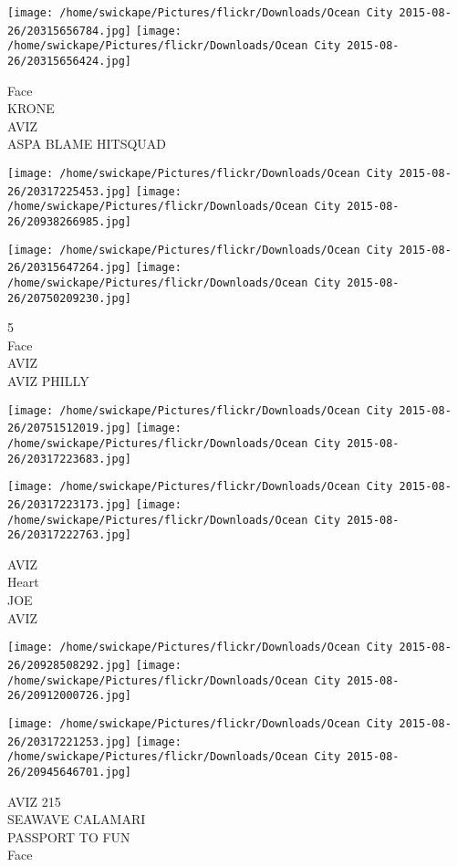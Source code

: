 \documentclass[10pt,letterpaper]{article}
\begin{document}
\texttt{[image: /home/swickape/Pictures/flickr/Downloads/Ocean City 2015-08-26/20315656784.jpg]}
\texttt{[image: /home/swickape/Pictures/flickr/Downloads/Ocean City 2015-08-26/20315656424.jpg]}

Face\\
KRONE\\
AVIZ\\
ASPA BLAME HITSQUAD\\
\pagebreak

\texttt{[image: /home/swickape/Pictures/flickr/Downloads/Ocean City 2015-08-26/20317225453.jpg]}
\texttt{[image: /home/swickape/Pictures/flickr/Downloads/Ocean City 2015-08-26/20938266985.jpg]}

\texttt{[image: /home/swickape/Pictures/flickr/Downloads/Ocean City 2015-08-26/20315647264.jpg]}
\texttt{[image: /home/swickape/Pictures/flickr/Downloads/Ocean City 2015-08-26/20750209230.jpg]}

5\\
Face\\
AVIZ\\
AVIZ PHILLY\\
\pagebreak

\texttt{[image: /home/swickape/Pictures/flickr/Downloads/Ocean City 2015-08-26/20751512019.jpg]}
\texttt{[image: /home/swickape/Pictures/flickr/Downloads/Ocean City 2015-08-26/20317223683.jpg]}

\texttt{[image: /home/swickape/Pictures/flickr/Downloads/Ocean City 2015-08-26/20317223173.jpg]}
\texttt{[image: /home/swickape/Pictures/flickr/Downloads/Ocean City 2015-08-26/20317222763.jpg]}

AVIZ\\
Heart\\
JOE\\
AVIZ\\
\pagebreak

\texttt{[image: /home/swickape/Pictures/flickr/Downloads/Ocean City 2015-08-26/20928508292.jpg]}
\texttt{[image: /home/swickape/Pictures/flickr/Downloads/Ocean City 2015-08-26/20912000726.jpg]}

\texttt{[image: /home/swickape/Pictures/flickr/Downloads/Ocean City 2015-08-26/20317221253.jpg]}
\texttt{[image: /home/swickape/Pictures/flickr/Downloads/Ocean City 2015-08-26/20945646701.jpg]}

AVIZ 215\\
SEAWAVE CALAMARI\\
PASSPORT TO FUN\\
Face\\
\pagebreak
\end{document}
